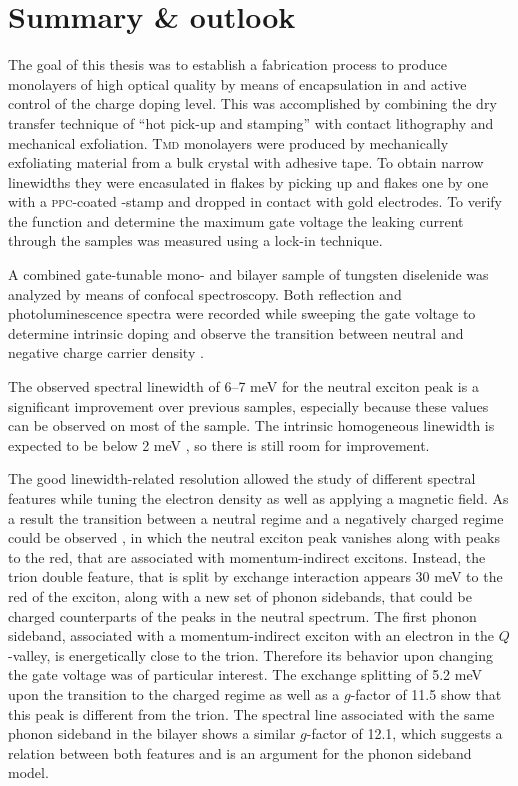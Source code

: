 \chapter{Summary \& outlook}

The goal of this thesis was to establish a fabrication process to produce \tmdg monolayers of high optical quality by means of encapsulation in \hbng and active control of the charge doping level. This was accomplished by combining the dry transfer technique of ``hot pick-up and stamping'' \cite{pizzocchero_hot_2016, tien_study_2016} with contact lithography and mechanical exfoliation. \textsc{Tmd} monolayers were produced by mechanically exfoliating material from a bulk crystal with adhesive tape. To obtain narrow linewidths they were encasulated in \hbng flakes by picking up \hbng and \tmdg flakes one by one with a \textsc{ppc}-coated \pdms-stamp and dropped in contact with gold electrodes. To verify the function and determine the maximum gate voltage the leaking current through the samples was measured using a lock-in technique.

A combined gate-tunable mono- and bilayer sample of tungsten diselenide was analyzed by means of confocal spectroscopy. Both reflection and photoluminescence spectra were recorded while sweeping the gate voltage to determine intrinsic doping and observe the transition between neutral and negative charge carrier density \cite{wang_probing_2017}.

The observed spectral linewidth of 6--7 meV for the neutral exciton peak is a significant improvement over previous samples, especially because these values can be observed on most of the sample. The intrinsic homogeneous linewidth is expected to be below 2 meV \cite{ajayi_approaching_2017}, so there is still room for improvement.

The good linewidth-related resolution allowed the study of different spectral features while tuning the electron density as well as applying a magnetic field. As a result the transition between a neutral regime and a negatively charged regime could be observed \cite{wang_probing_2017}, in which the neutral exciton peak vanishes along with peaks to the red, that are associated with momentum-indirect excitons. Instead, the trion double feature, that is split by exchange interaction appears 30 meV to the red of the exciton, along with a new set of phonon sidebands, that could be charged counterparts of the peaks in the neutral spectrum. The first phonon sideband, associated with a momentum-indirect exciton with an electron in the $Q$-valley, is energetically close to the trion. Therefore its behavior upon changing the gate voltage was of particular interest. The exchange splitting of 5.2 meV upon the transition to the charged regime as well as a $g$-factor of 11.5 show that this peak is different from the trion. The spectral line associated with the same phonon sideband in the bilayer shows a similar $g$-factor of 12.1, which suggests a relation between both features and is an argument for the phonon sideband model.

